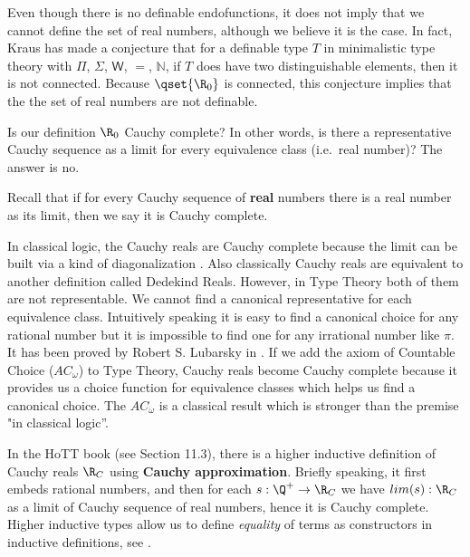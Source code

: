 Even though there is no definable endofunctions, it does not imply that we cannot define the set of real numbers, although we believe it is the case. In fact, Kraus has made a conjecture that for a definable type $T$ in minimalistic type theory with $\Pi$, $\Sigma$, $\mathsf{W}$, $=$, $\mathbb N$, if $T$ does have two distinguishable elements, then it is not connected. Because $\qset{\R_0}$ is connected, this conjecture implies that the the set of real numbers are not definable.



\begin{remark}

Is our definition $\R_0$ Cauchy complete? In other
words, is there a representative Cauchy sequence as a limit for every
equivalence class (i.e.\ real number)? The answer is no. 

Recall that if for every Cauchy sequence of \textbf{real} numbers there is a real number as its limit, then we say it is Cauchy complete.

In classical logic, the Cauchy reals are Cauchy complete because the
limit can be built via a kind of diagonalization
\cite{DBLP:journals/entcs/Lubarsky07}. Also classically Cauchy reals are equivalent to another definition called Dedekind Reals.
However, in Type Theory both of them are not representable.
We cannot find a canonical representative for each equivalence
class. Intuitively speaking it is easy to find a canonical choice for
any rational number but it is impossible to find one for any
irrational number like $\pi$. It has been proved by Robert S. Lubarsky in
\cite{DBLP:journals/entcs/Lubarsky07}. If we add the axiom of Countable Choice ($AC_{\omega}$) to Type Theory, Cauchy reals become Cauchy complete because it provides us a choice function for equivalence classes which helps us find a canonical choice. The $AC_{\omega}$ is a classical result
which is stronger than the premise "in classical logic''.

In the HoTT book \cite{hott} (see Section 11.3), there is a higher inductive definition of Cauchy reals $\R_{C}$ using \textbf{Cauchy approximation}. Briefly speaking, it first embeds rational numbers, and then for each $s : \Q^{+} \to \R_{C}$ we have $lim(s) : \R_{C}$ as a limit of Cauchy sequence of real numbers, hence it is Cauchy complete. Higher inductive types allow us to define \emph{equality} of terms as constructors in inductive definitions, see .
\end{remark}


